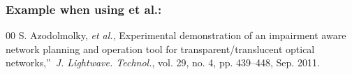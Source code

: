 \documentclass{IEEEoj}
\begin{document}
\subsubsection*{Example when using et al.:}

\begin{thebibliography}{00}
 S. Azodolmolky, \textit{et al.}, Experimental demonstration of an impairment aware network planning and operation tool for transparent/translucent optical networks,''~\textit{J. Lightwave. Technol.}, vol. 29, no. 4, pp. 439--448, Sep. 2011.
\end{thebibliography}
\end{document}
